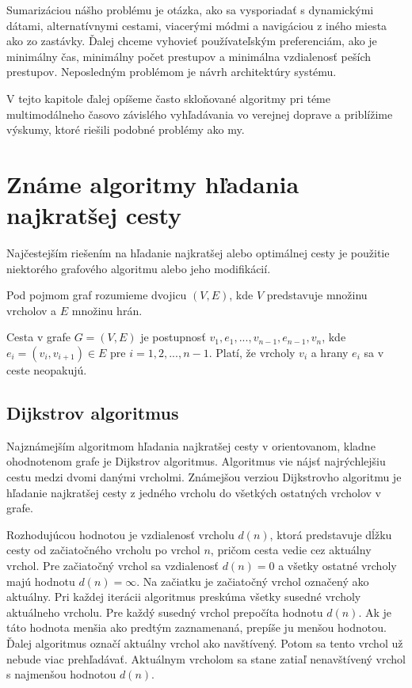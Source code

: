 Sumarizáciou nášho problému je otázka, ako sa vysporiadať s dynamickými dátami, alternatívnymi cestami, viacerými módmi a navigáciou z iného miesta ako zo zastávky. Ďalej chceme vyhovieť používateľským preferenciám, ako je minimálny čas, minimálny počet prestupov a minimálna vzdialenosť peších prestupov. Neposledným problémom je návrh architektúry systému.

V tejto kapitole ďalej opíšeme často skloňované algoritmy pri téme multimodálneho časovo závislého vyhľadávania vo verejnej doprave a priblížime výskumy, ktoré riešili podobné problémy ako my.

\section{Známe algoritmy hľadania najkratšej cesty}
\label{sec:known-algorithms}

Najčestejším riešením na hľadanie najkratšej alebo optimálnej cesty je použitie niektorého grafového algoritmu alebo jeho modifikácií. 

Pod pojmom graf rozumieme dvojicu $(V, E)$, kde $V$ predstavuje množinu vrcholov a $E$ množinu hrán. 

Cesta v grafe $G = (V, E)$ je postupnosť $v_1, e_1, ..., v_{n-1}, e_{n-1}, v_n$, kde $ e_i = (v_i, v_{i+1}) \in E$ pre $ i = 1, 2,..., n-1$. Platí, že vrcholy $v_i$ a hrany $e_i$ sa v ceste neopakujú.

\subsection{Dijkstrov algoritmus}
\label{sec:dijkstra}
Najznámejším algoritmom hľadania najkratšej cesty v orientovanom, kladne ohodnotenom grafe je Dijkstrov algoritmus. Algoritmus vie nájsť najrýchlejšiu cestu medzi dvomi danými vrcholmi. Známejšou verziou Dijkstrovho algoritmu je hľadanie najkratšej cesty z jedného vrcholu do všetkých ostatných vrcholov v grafe. 

Rozhodujúcou hodnotou je vzdialenosť vrcholu $d(n)$, ktorá predstavuje dĺžku cesty od začiatočného vrcholu po vrchol $n$, pričom cesta vedie cez aktuálny vrchol.
Pre začiatočný vrchol sa vzdialenosť $d(n) = 0$ a všetky ostatné vrcholy majú hodnotu $d(n) = \infty$. Na začiatku je začiatočný vrchol označený ako aktuálny. Pri každej iterácii algoritmus preskúma všetky susedné vrcholy aktuálneho vrcholu. Pre každý susedný vrchol prepočíta hodnotu $d(n)$. Ak je táto hodnota menšia ako predtým zaznamenaná, prepíše ju menšou hodnotou. Ďalej algoritmus označí aktuálny vrchol ako navštívený. Potom sa tento vrchol už nebude viac prehľadávať. Aktuálnym vrcholom sa stane zatiaľ nenavštívený vrchol s najmenšou hodnotou $d(n)$. 

